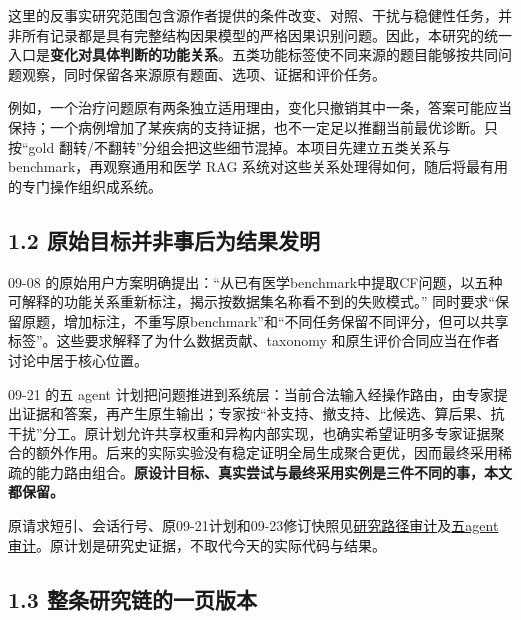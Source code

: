\documentclass[
  11pt,
  a4paper,
]{article}
\begin{document}
这里的反事实研究范围包含源作者提供的条件改变、对照、干扰与稳健性任务，并非所有记录都是具有完整结构因果模型的严格因果识别问题。因此，本研究的统一入口是\textbf{变化对具体判断的功能关系}。五类功能标签使不同来源的题目能够按共同问题观察，同时保留各来源原有题面、选项、证据和评价任务。

例如，一个治疗问题原有两条独立适用理由，变化只撤销其中一条，答案可能应当保持；一个病例增加了某疾病的支持证据，也不一定足以推翻当前最优诊断。只按``gold
翻转/不翻转''分组会把这些细节混掉。本项目先建立五类关系与
benchmark，再观察通用和医学 RAG
系统对这些关系处理得如何，随后将最有用的专门操作组织成系统。

\subsection{1.2
原始目标并非事后为结果发明}\label{ux539fux59cbux76eeux6807ux5e76ux975eux4e8bux540eux4e3aux7ed3ux679cux53d1ux660e}

09-08
的原始用户方案明确提出：``从已有医学benchmark中提取CF问题，以五种可解释的功能关系重新标注，揭示按数据集名称看不到的失败模式。''
同时要求``保留原题，增加标注，不重写原benchmark''和``不同任务保留不同评分，但可以共享标签''。这些要求解释了为什么数据贡献、taxonomy
和原生评价合同应当在作者讨论中居于核心位置。

09-21 的五 agent
计划把问题推进到系统层：当前合法输入经操作路由，由专家提出证据和答案，再产生原生输出；专家按``补支持、撤支持、比候选、算后果、抗干扰''分工。原计划允许共享权重和异构内部实现，也确实希望证明多专家证据聚合的额外作用。后来的实际实验没有稳定证明全局生成聚合更优，因而最终采用稀疏的能力路由组合。\textbf{原设计目标、真实尝试与最终采用实例是三件不同的事，本文都保留。}

原请求短引、会话行号、原09-21计划和09-23修订快照见\href{https://github.com/xiotakut/cf_mrg/blob/main/papers/2026-10-02_cf_moa/author_dossier/sources/77369dcb2268_research_path_audit.json}{研究路径审计}及\href{https://github.com/xiotakut/cf_mrg/blob/main/papers/2026-10-02_cf_moa/author_dossier/sources/2c8121d3938b_five_agent_framework_audit.json}{五agent审计}。原计划是研究史证据，不取代今天的实际代码与结果。

\subsection{1.3
整条研究链的一页版本}\label{ux6574ux6761ux7814ux7a76ux94feux7684ux4e00ux9875ux7248ux672c}
\end{document}
